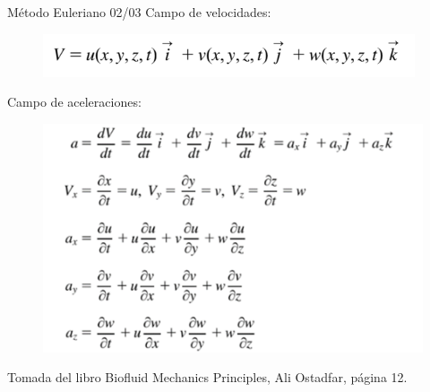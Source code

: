 \begin{frame}{Método Euleriano 02/03}
\justifying
Campo de velocidades:
\begin{figure}[H]
\centering
\includegraphics[scale=0.4]{Section_Files/picmanuel/04.png}
\label{fig: Figura2-Fig0403-01}
\end{figure}
Campo de aceleraciones:
\begin{figure}[H]
\centering
\includegraphics[scale=0.3]{Section_Files/picmanuel/05.png}
\label{fig: Figura2-Fig0403-02}
\end{figure}
{\tiny Tomada del libro Biofluid Mechanics Principles, Ali Ostadfar, página 12.}
\end{frame}	

